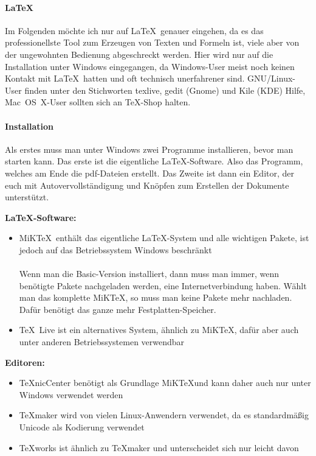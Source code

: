 \paragraph{\LaTeX}
Im Folgenden möchte ich nur auf \LaTeX~genauer eingehen, da es das professionellste Tool zum Erzeugen von Texten und Formeln ist, viele aber von der ungewohnten Bedienung abgeschreckt werden.
Hier wird nur auf die Installation unter Windows eingegangen, da Windows-User meist noch keinen Kontakt mit \LaTeX~hatten und oft technisch unerfahrener sind.
GNU/Linux-User finden unter den Stichworten texlive, gedit (Gnome) und Kile (KDE) Hilfe, Mac~OS~X-User sollten sich an TeX-Shop halten.

\paragraph{Installation}
Als erstes muss man unter Windows zwei Programme installieren, bevor man starten kann.
Das erste ist die eigentliche \LaTeX -Software.
Also das Programm, welches am Ende die pdf-Dateien erstellt.
Das Zweite ist dann ein Editor, der euch mit Autovervollständigung und Knöpfen zum Erstellen der Dokumente unterstützt.

\textbf{\LaTeX -Software:}
\begin{itemize}
    \item MiK\TeX~enthält das eigentliche \LaTeX-System und alle wichtigen Pakete, ist jedoch auf das Betriebssystem Windows beschränkt \\
        \\
        Wenn man die Basic-Version installiert, dann muss man immer, wenn benötigte Pakete nachgeladen werden, eine Internetverbindung haben.
        Wählt man das komplette MiK\TeX, so muss man keine Pakete mehr nachladen.
        Dafür benötigt das ganze mehr Festplatten-Speicher.
    \item \TeX~Live ist ein alternatives System, ähnlich zu MiK\TeX, dafür aber auch unter anderen Betriebssystemen verwendbar \\
\end{itemize}

\textbf{Editoren:}
\begin{itemize}
    \item \TeX nicCenter benötigt als Grundlage MiK\TeX und kann daher auch nur unter Windows verwendet werden \\
    \item \TeX maker wird von vielen Linux-Anwendern verwendet, da es standardmäßig Unicode als Kodierung verwendet \\
    \item \TeX works ist ähnlich zu \TeX maker und unterscheidet sich nur leicht davon \\
\end{itemize}

